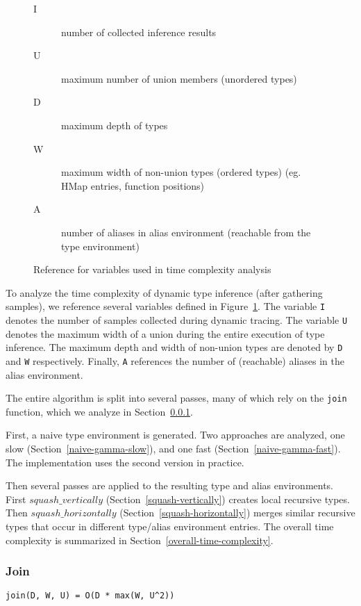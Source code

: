 \begin{figure}
\begin{mdframed}
\begin{description}
  \item [I] number of collected inference results
  \item [U] maximum number of union members (unordered types)
  \item [D] maximum depth of types
  \item [W] maximum width of non-union types (ordered types) (eg. HMap entries, function positions)
  \item [A] number of aliases in alias environment (reachable from the type environment)
\end{description}
\end{mdframed}
\caption{Reference for variables used in time complexity analysis}
\label{time-complexity-vars}
\end{figure}

To analyze the time complexity of dynamic type inference (after
gathering samples), we reference several variables 
defined in Figure~\ref{time-complexity-vars}.
The variable \texttt{I} denotes the number of samples
collected during dynamic tracing. The variable \texttt{U}
denotes the maximum width of a union during the entire execution
of type inference.
The maximum depth and width of non-union types are denoted by
\texttt{D} and \texttt{W} respectively.
Finally, \texttt{A} references the number of (reachable) aliases in the
alias environment.

The entire algorithm is split into several passes, many of which
rely on the \texttt{join} function, which we analyze in Section~\ref{join}.

First, a naive type environment is generated. Two approaches
are analyzed, 
one slow (Section~\ref{naive-gamma-slow}),
and one fast (Section~\ref{naive-gamma-fast}).
The implementation uses the second version in practice.

Then several passes are applied to the resulting type and
alias environments. First $squash\_vertically$
(Section~\ref{squash-vertically}) creates local recursive
types.
Then $squash\_horizontally$ (Section~\ref{squash-horizontally})
merges similar recursive types that occur in different type/alias
environment entries.
The overall time complexity is summarized in Section~\ref{overall-time-complexity}.

\subsubsection{Join}
\label{join}
\begin{verbatim}
join(D, W, U) = O(D * max(W, U^2))
\end{verbatim}

